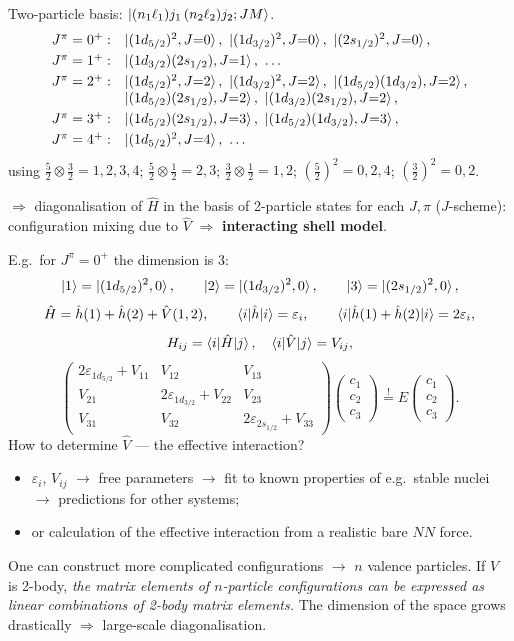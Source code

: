 \documentclass[11pt,a4paper]{article}
\newcommand{\op}[1]{\hat{#1}}
\begin{document}
Two-particle basis: $\ket{(n_1\ell_1)j_1\,(n_2\ell_2)j_2;JM}$.
\[
\begin{array}{ll}
J^\pi=0^+: & \ket{(1d_{5/2})^2,J{=}0},\ \ket{(1d_{3/2})^2,J{=}0},\ \ket{(2s_{1/2})^2,J{=}0},\\[1mm]
J^\pi=1^+: & \ket{(1d_{3/2})(2s_{1/2}),J{=}1},\ \dots\\[1mm]
J^\pi=2^+: & \ket{(1d_{5/2})^2,J{=}2},\ \ket{(1d_{3/2})^2,J{=}2},\ \ket{(1d_{5/2})(1d_{3/2}),J{=}2},\\
           & \ket{(1d_{5/2})(2s_{1/2}),J{=}2},\ \ket{(1d_{3/2})(2s_{1/2}),J{=}2},\\[1mm]
J^\pi=3^+: & \ket{(1d_{5/2})(2s_{1/2}),J{=}3},\ \ket{(1d_{5/2})(1d_{3/2}),J{=}3},\\[1mm]
J^\pi=4^+: & \ket{(1d_{5/2})^2,J{=}4},\ \dots
\end{array}
\]
using $\frac52\otimes\frac32=1,2,3,4$; $\frac52\otimes\frac12=2,3$; $\frac32\otimes\frac12=1,2$; $(\frac52)^2=0,2,4$; $(\frac32)^2=0,2$.

$\Rightarrow$ diagonalisation of $\op H$ in the basis of 2-particle states for each $J,\pi$ ($J$-scheme): configuration mixing due to $\op V$ $\Rightarrow$ \textbf{interacting shell model}.

E.g.\ for $J^\pi=0^+$ the dimension is 3:
\[
\ket1=\ket{(1d_{5/2})^2,0},\qquad \ket2=\ket{(1d_{3/2})^2,0},\qquad \ket3=\ket{(2s_{1/2})^2,0},
\]
\[
\op H=\op h(1)+\op h(2)+\op V(1,2),\qquad
\braket{i|\op h|i}=\varepsilon_i,\qquad \braket{i|\op h(1)+\op h(2)|i}=2\varepsilon_i,
\]
\[
H_{ij}=\braket{i|\op H|j},\quad \braket{i|\op V|j}=V_{ij},
\]
\[
\begin{pmatrix}
2\varepsilon_{1d_{5/2}}+V_{11} & V_{12} & V_{13}\\
V_{21} & 2\varepsilon_{1d_{3/2}}+V_{22} & V_{23}\\
V_{31} & V_{32} & 2\varepsilon_{2s_{1/2}}+V_{33}
\end{pmatrix}
\begin{pmatrix}c_1\\c_2\\c_3\end{pmatrix}
\overset{!}{=}E\begin{pmatrix}c_1\\c_2\\c_3\end{pmatrix}.
\]
How to determine $\op V$ --- the effective interaction?
\begin{itemize}
\item $\varepsilon_i$, $V_{ij}$ $\to$ free parameters $\to$ fit to known properties of e.g.\ stable nuclei $\to$ predictions for other systems;
\item or calculation of the effective interaction from a realistic bare $NN$ force.
\end{itemize}
One can construct more complicated configurations $\to$ $n$ valence particles. If $V$ is 2-body, \emph{the matrix elements of $n$-particle configurations can be expressed as linear combinations of 2-body matrix elements.} The dimension of the space grows drastically $\Rightarrow$ large-scale diagonalisation.
\end{document}
